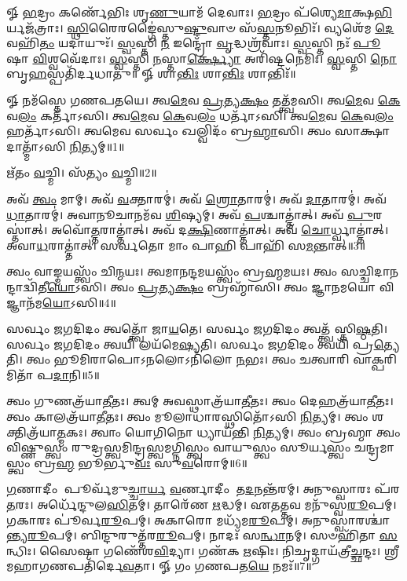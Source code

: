 


𑍐 \ul{𑌭}\-𑌦𑍍𑌰𑌂 𑌕𑌰𑍍𑌣𑍇᳴𑌭𑌿𑌃 𑌶𑍃\-\ul{𑌣𑍁}\-𑌯𑌾𑌮᳴ 𑌦𑍇𑌵𑌾𑌃। \ul{𑌭}\-𑌦𑍍𑌰𑌂 𑌪᳴𑌶𑍍𑌯𑍇\-\ul{𑌮𑌾}\-𑌕𑍍𑌷\-\ul{𑌭𑌿}\-𑌰𑍍𑌯𑌜᳴𑌤𑍍𑌰𑌾𑌃। 
\-\ul{𑌸𑍍𑌥𑌿}\-𑌰𑍈𑌰𑌙𑍍𑌗𑍈॑𑌸𑍍𑌤𑍁\-\ul{𑌷𑍍𑌟𑍁}\-𑌵𑌾𑍞 𑌸᳴\-\ul{𑌸𑍍𑌤}\-𑌨𑍂𑌭𑌿𑌃᳴। 𑌵𑍍𑌯𑌶𑍇᳴𑌮 \ul{𑌦𑍇}\-𑌵𑌹𑌿᳴\-\ul{𑌤𑌂} 𑌯𑌦𑌾𑌯𑍁𑌃᳴। 
\-\ul{𑌸𑍍𑌵}\-𑌸𑍍𑌤𑌿 \ul{𑌨} 𑌇𑌨𑍍𑌦𑍍𑌰𑍋᳴ \ul{𑌵𑍃}\-𑌦𑍍𑌧𑌶𑍍𑌰᳴𑌵𑌾𑌃। \ul{𑌸𑍍𑌵}\-𑌸𑍍𑌤𑌿 𑌨𑌃᳴ \ul{𑌪𑍂}\-𑌷𑌾 \ul{𑌵𑌿}\-𑌶𑍍𑌵𑌵𑍇᳴𑌦𑌾𑌃। 
\-\ul{𑌸𑍍𑌵}\-𑌸𑍍𑌤𑌿 \ul{𑌨}\-𑌸𑍍𑌤𑌾\-\ul{𑌰𑍍𑌕𑍍𑌷𑍍𑌯𑍋} 𑌅𑌰𑌿᳴𑌷𑍍𑌟𑌨𑍇𑌮𑌿𑌃। \ul{𑌸𑍍𑌵}\-𑌸𑍍𑌤𑌿 \ul{𑌨𑍋} 𑌬𑍃\-\ul{𑌹}\-𑌸𑍍𑌪𑌤𑌿᳴𑌰𑍍𑌦𑌧𑌾𑌤𑍁॥
𑍐 𑌶𑌾\-\ul{𑌨𑍍𑌤𑌿𑌃} 𑌶𑌾\-\ul{𑌨𑍍𑌤𑌿𑌃} 𑌶𑌾𑌨𑍍𑌤𑌿𑌃᳴॥

𑍐 𑌨𑌮᳴𑌸𑍍𑌤𑍇 𑌗𑌣𑌪𑌤𑌯𑍇। 𑌤𑍍𑌵\-\ul{𑌮𑍇}\-𑌵 \ul{𑌪𑍍𑌰}\-𑌤𑍍𑌯\-\ul{𑌕𑍍𑌷𑌂} 𑌤𑌤𑍍𑌤𑍍𑌵᳴𑌮𑌸𑌿।
𑌤𑍍𑌵\-\ul{𑌮𑍇}\-𑌵 \ul{𑌕𑍇}\-𑌵\-\ul{𑌲𑌂} 𑌕𑌰𑍍𑌤𑌾᳴𑌽𑌸𑌿। 𑌤𑍍𑌵\-\ul{𑌮𑍇}\-𑌵 \ul{𑌕𑍇}\-𑌵\-\ul{𑌲𑌂} 𑌧𑌰𑍍𑌤𑌾᳴𑌽𑌸𑌿।  𑌤𑍍𑌵\-\ul{𑌮𑍇}\-𑌵 \ul{𑌕𑍇}\-𑌵\-\ul{𑌲𑌂} 𑌹𑌰𑍍𑌤𑌾᳴𑌽𑌸𑌿।
𑌤𑍍𑌵𑌮𑍇𑌵 𑌸𑌰𑍍𑌵𑌂 𑌖𑌲𑍍𑌵𑌿𑌦𑌂᳴ 𑌬𑍍𑌰\-\ul{𑌹𑍍𑌮𑌾}\-𑌸𑌿।  𑌤𑍍𑌵𑌂 𑌸𑌾𑌕𑍍𑌷𑌾𑌦𑌾𑌤𑍍𑌮𑌾᳴𑌽𑌸𑌿 \ul{𑌨𑌿}\-𑌤𑍍𑌯𑌮𑍍॥1॥

𑌋᳴𑌤𑌂 \ul{𑌵}\-𑌚𑍍𑌮𑌿। 𑌸᳴𑌤𑍍𑌯𑌂 \ul{𑌵}\-𑌚𑍍𑌮𑌿॥2॥

𑌅𑌵᳴ \ul{𑌤𑍍𑌵𑌂} 𑌮𑌾𑌮𑍍।  𑌅𑌵᳴ \ul{𑌵}\-𑌕𑍍𑌤𑌾𑌰𑌮𑍍॑। 𑌅𑌵᳴ \ul{𑌶𑍍𑌰𑍋}\-𑌤𑌾𑌰𑌮𑍍॑। 𑌅𑌵᳴ \ul{𑌦𑌾}\-𑌤𑌾𑌰𑌮𑍍॑।  𑌅𑌵᳴ \ul{𑌧𑌾}\-𑌤𑌾𑌰𑌮𑍍॑।
𑌅𑌵𑌾𑌨𑍂𑌚𑌾𑌨𑌮᳴𑌵 \ul{𑌶𑌿}\-𑌷𑍍𑌯𑌮𑍍। 𑌅𑌵᳴ \ul{𑌪}\-𑌶𑍍𑌚𑌾𑌤𑍍𑌤𑌾॑𑌤𑍍।  𑌅𑌵᳴ \ul{𑌪𑍁}\-𑌰𑌸𑍍𑌤𑌾॑𑌤𑍍। 𑌅𑌵𑍋᳴\-\ul{𑌤𑍍𑌤}\-𑌰𑌾𑌤𑍍𑌤𑌾॑𑌤𑍍।
𑌅𑌵᳴ 𑌦\-\ul{𑌕𑍍𑌷𑌿}\-𑌣𑌾𑌤𑍍𑌤𑌾॑𑌤𑍍। 𑌅𑌵᳴ \ul{𑌚𑍋}\-𑌰𑍍𑌧𑍍𑌵𑌾𑌤𑍍𑌤𑌾॑𑌤𑍍।  𑌅𑌵𑌾\-\ul{𑌧}\-𑌰𑌾𑌤𑍍𑌤𑌾॑𑌤𑍍।
𑌸𑌰𑍍𑌵𑌤𑍋 𑌮𑌾𑌂 𑌪𑌾𑌹𑌿 𑌪𑌾𑌹𑌿᳴ 𑌸\-\ul{𑌮}\-𑌨𑍍𑌤𑌾𑌤𑍍॥3॥

𑌤𑍍𑌵𑌂 𑌵𑌾𑌙𑍍𑌮𑌯𑌸𑍍𑌤𑍍𑌵𑌂᳴ 𑌚𑌿\-\ul{𑌨𑍍𑌮}\-𑌯𑌃। 𑌤𑍍𑌵𑌮𑌾𑌨𑌨𑍍𑌦𑌮𑌯𑌸𑍍𑌤𑍍𑌵𑌂᳴ 𑌬𑍍𑌰\-\ul{𑌹𑍍𑌮}\-𑌮𑌯𑌃।  𑌤𑍍𑌵𑌂 𑌸𑌚𑍍𑌚𑌿𑌦𑌾𑌨𑌨𑍍𑌦𑌾𑌦𑍍𑌵𑌿᳴𑌤𑍀\-\ul{𑌯𑍋}\-𑌽𑌸𑌿।
𑌤𑍍𑌵𑌂 \ul{𑌪𑍍𑌰}\-𑌤𑍍𑌯\-\ul{𑌕𑍍𑌷𑌂} 𑌬𑍍𑌰𑌹𑍍𑌮𑌾᳴𑌸𑌿।  𑌤𑍍𑌵𑌂 𑌜𑍍𑌞𑌾𑌨𑌮𑌯𑍋 𑌵𑌿𑌜𑍍𑌞𑌾𑌨᳴𑌮\-\ul{𑌯𑍋}\-𑌽𑌸𑌿॥4॥

𑌸𑌰𑍍𑌵𑌂 𑌜𑌗𑌦𑌿𑌦𑌂 𑌤𑍍𑌵𑌤𑍍𑌤𑍍𑌵𑍋᳴ 𑌜𑌾\-\ul{𑌯}\-𑌤𑍇। 𑌸𑌰𑍍𑌵𑌂 𑌜𑌗𑌦𑌿𑌦𑌂 𑌤𑍍𑌵𑌤𑍍𑌤𑍍𑌵᳴𑌸𑍍𑌤𑌿\-\ul{𑌷𑍍𑌠}\-𑌤𑌿।
𑌸𑌰𑍍𑌵𑌂 𑌜𑌗𑌦𑌿𑌦𑌂 𑌤𑍍𑌵𑌯𑌿 𑌲𑌯᳴𑌮𑍇\-\ul{𑌷𑍍𑌯}\-𑌤𑌿। 𑌸𑌰𑍍𑌵𑌂 𑌜𑌗𑌦𑌿𑌦𑌂 𑌤𑍍𑌵𑌯𑌿᳴ 𑌪𑍍𑌰\-\ul{𑌤𑍍𑌯𑍇}\-𑌤𑌿।
𑌤𑍍𑌵𑌂 𑌭𑍂𑌮𑌿𑌰𑌾𑌪𑍋𑌽𑌨𑌲𑍋𑌽𑌨𑌿᳴𑌲𑍋 \ul{𑌨}\-𑌭𑌃।  𑌤𑍍𑌵𑌂 𑌚𑌤𑍍𑌵𑌾𑌰𑌿 𑌵𑌾𑌕𑍍𑌪𑌰𑌿𑌮𑌿𑌤𑌾᳴ 𑌪\-\ul{𑌦𑌾}\-𑌨𑌿॥5॥

𑌤𑍍𑌵𑌂 𑌗𑍁𑌣𑌤𑍍𑌰᳴𑌯𑌾\-\ul{𑌤𑍀}\-𑌤𑌃।  𑌤𑍍𑌵𑌮𑍍 𑌅𑌵𑌸𑍍𑌥𑌾𑌤𑍍𑌰᳴𑌯𑌾\-\ul{𑌤𑍀}\-𑌤𑌃। 𑌤𑍍𑌵𑌂 𑌦𑍇𑌹𑌤𑍍𑌰᳴𑌯𑌾\-\ul{𑌤𑍀}\-𑌤𑌃।
𑌤𑍍𑌵𑌂 𑌕𑌾𑌲𑌤𑍍𑌰᳴𑌯𑌾\-\ul{𑌤𑍀}\-𑌤𑌃। 𑌤𑍍𑌵𑌂 𑌮𑍂𑌲𑌾𑌧𑌾𑌰𑌸𑍍𑌥𑌿𑌤𑍋᳴𑌽𑌸𑌿 \ul{𑌨𑌿}\-𑌤𑍍𑌯𑌮𑍍। 𑌤𑍍𑌵𑌂 𑌶𑌕𑍍𑌤𑌿𑌤𑍍𑌰᳴𑌯𑌾\-\ul{𑌤𑍍𑌮}\-𑌕𑌃।
𑌤𑍍𑌵𑌾𑌂 𑌯𑍋𑌗𑌿𑌨𑍋 𑌧𑍍𑌯𑌾𑌯᳴𑌨𑍍𑌤𑌿 \ul{𑌨𑌿}\-𑌤𑍍𑌯𑌮𑍍।  𑌤𑍍𑌵𑌂 𑌬𑍍𑌰𑌹𑍍𑌮𑌾 𑌤𑍍𑌵𑌂 𑌵𑌿𑌷𑍍𑌣𑍁𑌸𑍍𑌤𑍍𑌵𑌂 𑌰𑍁𑌦𑍍𑌰𑌸𑍍𑌤𑍍𑌵𑌮𑌿𑌨𑍍𑌦𑍍𑌰𑌸𑍍𑌤𑍍𑌵𑌮𑌗𑍍𑌨𑌿𑌸𑍍𑌤𑍍𑌵𑌂
𑌵𑌾𑌯𑍁𑌸𑍍𑌤𑍍𑌵𑌂 𑌸𑍂𑌰𑍍𑌯𑌸𑍍𑌤𑍍𑌵𑌂 𑌚𑌨𑍍𑌦𑍍𑌰𑌮𑌾𑌸𑍍𑌤𑍍𑌵𑌂 𑌬𑍍𑌰\-\ul{𑌹𑍍𑌮} 𑌭𑍂𑌰𑍍𑌭𑍁\-\ul{𑌵𑌃} 𑌸𑍁\-\ul{𑌵}\-𑌰𑍋𑌮𑍍॥6॥

\-\ul{𑌗}\-𑌣𑌾𑌦𑍀𑌂 𑌪𑍂𑌰𑍍𑌵᳴𑌮𑍁\-\ul{𑌚𑍍𑌚𑌾}\-\-\ul{𑌰𑍍𑌯} \ul{𑌵}\-𑌰𑍍𑌣𑌾𑌦𑍀𑌂 𑌤\-\ul{𑌦}\-𑌨𑌨𑍍𑌤᳴𑌰𑌮𑍍। 𑌅𑌨𑍁𑌸𑍍𑌵𑌾𑌰𑌃 𑌪᳴𑌰\-\ul{𑌤}\-𑌰𑌃। 𑌅𑌰𑍍𑌧𑍇᳴𑌨𑍍𑌦𑍁𑌲\-\ul{𑌸𑌿}\-𑌤𑌮𑍍।
𑌤𑌾𑌰𑍇᳴𑌣 \ul{𑌋}\-𑌦𑍍𑌧𑌮𑍍।  𑌏𑌤𑌤𑍍𑌤𑌵 𑌮𑌨𑍁᳴𑌸𑍍𑌵\-\ul{𑌰𑍂}\-𑌪𑌮𑍍। 𑌗𑌕𑌾𑌰𑌃 𑌪𑍂॑𑌰𑍍𑌵\-\ul{𑌰𑍂}\-𑌪𑌮𑍍।  𑌅𑌕𑌾𑌰𑍋 𑌮𑌧𑍍𑌯᳴𑌮\-\ul{𑌰𑍂}\-𑌪𑌮𑍍।
𑌅𑌨𑍁𑌸𑍍𑌵𑌾𑌰𑌶𑍍𑌚𑌾॑𑌨𑍍𑌤𑍍𑌯\-\-\ul{𑌰𑍂}\-𑌪𑌮𑍍।  𑌬𑌿𑌨𑍍𑌦𑍁𑌰𑍁𑌤𑍍𑌤᳴𑌰\-\ul{𑌰𑍂}\-𑌪𑌮𑍍। 𑌨𑌾𑌦𑌃᳴ 𑌸\-\ul{𑌨𑍍𑌧𑌾}\-𑌨𑌮𑍍।  𑌸𑍞𑌹𑌿᳴𑌤𑌾 \ul{𑌸}\-𑌨𑍍𑌧𑌿𑌃। 
𑌸𑍈𑌷𑌾 𑌗𑌣𑍇᳴𑌶\-\ul{𑌵𑌿}\-𑌦𑍍𑌯𑌾। 𑌗𑌣᳴𑌕 \ul{𑌋}\-𑌷𑌿𑌃। 𑌨𑌿𑌚𑍃𑌦𑍍𑌗𑌾𑌯᳴𑌤𑍍𑌰𑍀\-\ul{𑌚𑍍𑌛}\-𑌨𑍍𑌦𑌃।
𑌶𑍍𑌰𑍀𑌮𑌹𑌾𑌗𑌣𑌪𑌤𑌿᳴𑌰𑍍𑌦𑍇\-\ul{𑌵}\-𑌤𑌾। 𑍐 𑌗𑌂 𑌗𑌣𑌪𑌤\-\ul{𑌯𑍇} 𑌨𑌮𑌃᳴॥7॥

